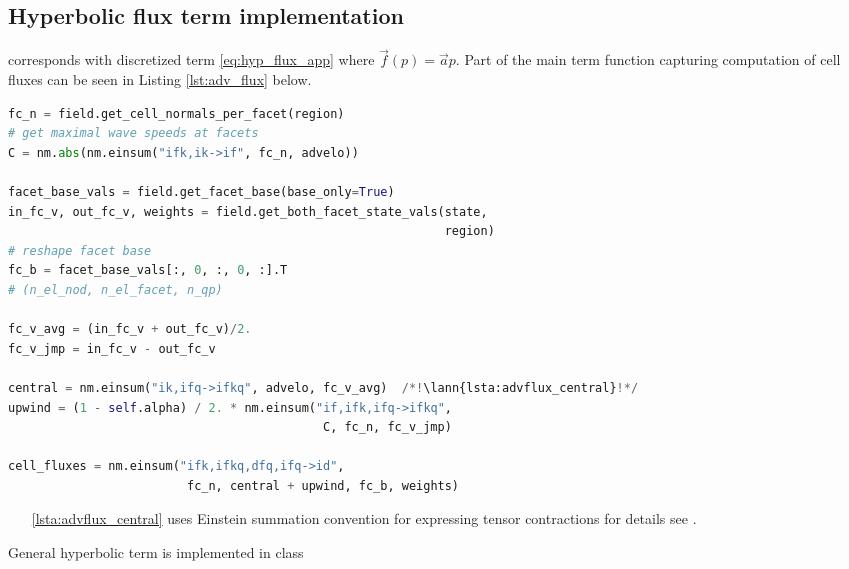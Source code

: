 \subsection{Hyperbolic flux term implementation}
\label{se:adv_flux_term_imp}
 corresponds with discretized term \eqref{eq:hyp_flux_app} 
where $\vec{f}(p) = \vec{a}p$. Part of the main term function capturing computation of 
cell fluxes can be seen in Listing \ref{lst:adv_flux} below. 
\setcounter{lstannotation}{0}
\begin{lstlisting}[language=Python, caption=Computation of advection cell 
fluxes \label{lst:adv_flux}]
fc_n = field.get_cell_normals_per_facet(region)
# get maximal wave speeds at facets
C = nm.abs(nm.einsum("ifk,ik->if", fc_n, advelo))

facet_base_vals = field.get_facet_base(base_only=True)
in_fc_v, out_fc_v, weights = field.get_both_facet_state_vals(state,
                                                             region)
# reshape facet base
fc_b = facet_base_vals[:, 0, :, 0, :].T
# (n_el_nod, n_el_facet, n_qp)

fc_v_avg = (in_fc_v + out_fc_v)/2.
fc_v_jmp = in_fc_v - out_fc_v

central = nm.einsum("ik,ifq->ifkq", advelo, fc_v_avg)  /*!\lann{lsta:advflux_central}!*/
upwind = (1 - self.alpha) / 2. * nm.einsum("if,ifk,ifq->ifkq",
                                            C, fc_n, fc_v_jmp)

cell_fluxes = nm.einsum("ifk,ifkq,dfq,ifq->id",
                         fc_n, central + upwind, fc_b, weights)
\end{lstlisting}
\begin{itemize}
    \item[\ref{lsta:advflux_central}]  uses Einstein 
    summation convention for expressing tensor contractions for details see 
    \cite{einsum-doc}.
\end{itemize}



General hyperbolic term is implemented in class 



